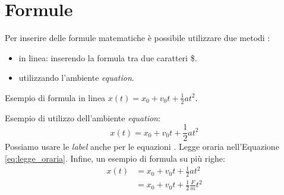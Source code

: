 \chapter{Formule} 
\label{chapter:formule}
Per inserire delle formule matematiche è possibile utilizzare due metodi \cite{prova1}:
\begin{itemize}
    \item in linea: inserendo la formula tra due caratteri \$. 
    \item utilizzando l'ambiente \textit{equation}.
\end{itemize}

\noindent Esempio di formula in linea $x(t)=x_{0} + v_{0}t + \frac{1}{2}at^{2}$.

\noindent Esempio di utilizzo dell'ambiente \textit{equation}:
\begin{equation}\label{eq:legge_oraria}
    x(t)=x_{0} + v_{0}t + \frac{1}{2}at^{2}
\end{equation}
Possiamo usare le \textit{label} anche per le equazioni \cite{wiki:latex}. Legge oraria nell'Equazione \ref{eq:legge_oraria}.
Infine, un esempio di formula su più righe:
\begin{equation}
    \begin{split}
    x(t) & = x_{0} + v_{0}t + \frac{1}{2}at^{2} \\
    & =	x_{0} + v_{0}t + \frac{1}{2}\frac{F}{m}t^{2}
    \end{split}
\end{equation}